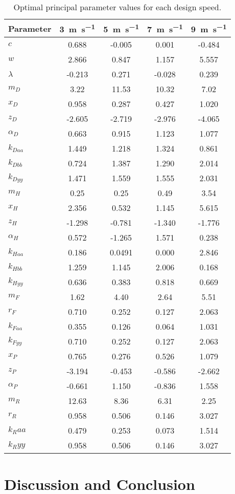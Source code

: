 \documentclass{bmd2019a}
\begin{document}
\begin{table}
  \caption{Optimal principal parameter values for each design speed.}
  \label{tab:optimal-values}
  \centering
  \begin{tabular}{lSSSS}
    \toprule
    Parameter & 3~\si{\meter\per\second} & 5~\si{\meter\per\second} & 7~\si{\meter\per\second} & 9~\si{\meter\per\second} \\
    \midrule
    $c$       & 0.688  & -0.005 & 0.001  & -0.484 \\
    $w$       & 2.866  & 0.847  & 1.157  & 5.557  \\
    $\lambda$ & -0.213 & 0.271  & -0.028 & 0.239  \\
    \midrule
    $m_D$ & 3.22   &  11.53 & 10.32  & 7.02 \\
    $x_D$ & 0.958  &  0.287 &  0.427 & 1.020 \\
    $z_D$ & -2.605 & -2.719 & -2.976 & -4.065 \\
    $\alpha_D$ & 0.663  & 0.915  & 1.123  & 1.077 \\
    $k_{Daa}$  & 1.449  & 1.218  &  1.324 & 0.861 \\
    $k_{Dbb}$  & 0.724  & 1.387  &  1.290 & 2.014 \\
    $k_{Dyy}$  & 1.471  & 1.559  &  1.555 & 2.031 \\
    \midrule
    $m_H$  & 0.25  & 0.25 &    0.49 &   3.54 \\
    $x_H$     & 2.356   & 0.532 &    1.145 &    5.615 \\
    $z_H$     & -1.298  & -0.781 &   -1.340 &   -1.776 \\
    $\alpha_H$ & 0.572  & -1.265 & 1.571  & 0.238 \\
    $k_{Haa}$ & 0.186  & 0.0491 &   0.000 &       2.846 \\
    $k_{Hbb}$ & 1.259   & 1.145 &     2.006 &    0.168 \\
    $k_{Hyy}$ & 0.636  & 0.383 &    0.818 &   0.669 \\
    \midrule
    $m_F$     & 1.62  & 4.40  & 2.64  & 5.51  \\
    $r_F$     & 0.710 & 0.252 & 0.127 & 2.063 \\
    $k_{Faa}$ & 0.355 & 0.126 & 0.064 & 1.031 \\
    $k_{Fyy}$ & 0.710 & 0.252 & 0.127 & 2.063 \\
    \midrule
    $x_P$      & 0.765  & 0.276  &  0.526 & 1.079 \\
    $z_P$      & -3.194 & -0.453 & -0.586 &-2.662 \\
    $\alpha_P$ & -0.661 & 1.150  & -0.836 & 1.558 \\
    \midrule
    $m_R$   & 12.63  & 8.36  &  6.31 & 2.25 \\
    $r_R$   & 0.958  & 0.506 & 0.146 & 3.027 \\
    $k_Raa$ & 0.479  & 0.253 & 0.073 & 1.514 \\
    $k_Ryy$ & 0.958  & 0.506 & 0.146 & 3.027 \\
    \bottomrule
  \end{tabular}
\end{table}

\section{Discussion and Conclusion}
%



\end{document}
